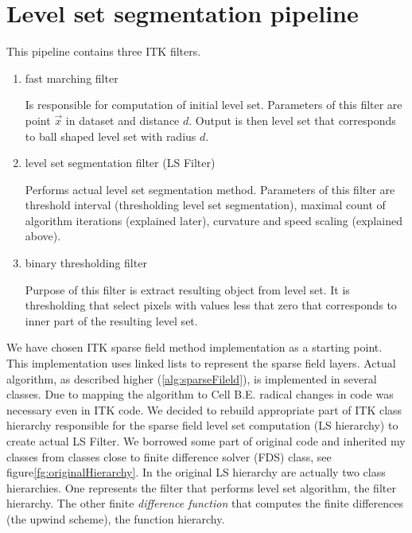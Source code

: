 \section{Level set segmentation pipeline}

This pipeline contains three ITK filters.
\begin{enumerate}
  \item{fast marching filter}
  \par
  Is responsible for computation of initial level set.
Parameters of this filter are point $\vec{x}$ in dataset and distance $d$.
Output is then level set that corresponds to ball shaped level set with radius $d$.

  \item{level set segmentation filter (LS Filter)}
  \par
  Performs actual level set segmentation method.
Parameters of this filter are threshold interval (thresholding level set segmentation),  maximal count of algorithm iterations (explained later), curvature and speed scaling (explained above).

  \item{binary thresholding filter}
  \par
  Purpose of this filter is extract resulting object from level set.
It is thresholding that select pixels with values less that zero that corresponds to inner part of the resulting level set.
\end{enumerate}

We have chosen ITK sparse field method implementation as a starting point.
This implementation uses linked lists to represent the sparse field layers.
Actual algorithm, as described higher (\ref{alg:sparseFileld}), is implemented in several classes.
Due to mapping the algorithm to Cell B.E. radical changes in code was necessary even in ITK code.
We decided to rebuild appropriate part of ITK class hierarchy responsible for the sparse field level set computation (LS hierarchy) to create actual LS Filter.
We borrowed some part of original code and inherited my classes from classes close to finite difference solver (FDS) class, see figure\ref{fg:originalHierarchy}.
In the original LS hierarchy are actually two class hierarchies.
One represents the filter that performs level set algorithm, the filter hierarchy.
The other finite \emph{difference function} that computes the finite differences (the upwind scheme), the function hierarchy.

